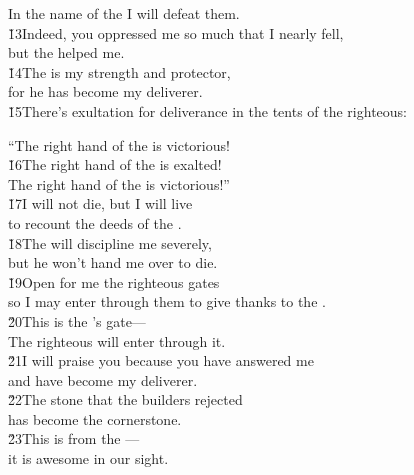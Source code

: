 \begin{poetry}
\poemlll       In the name of the  I will defeat them. \\
\poeml \v{13}Indeed, you oppressed me so much that I nearly fell, \\
\poemll    but the  helped me. \\
\poeml \v{14}The  is my strength and protector, \\
\poemll    for he has become my deliverer. \\
\poeml \v{15}There's exultation for deliverance in the tents of the righteous:
\end{poetry}

\begin{poetry}
\poeml ``The right hand of the  is victorious! \\
\poeml \v{16}The right hand of the  is exalted! \\
\poemlll       The right hand of the  is victorious!'' \\
\poeml \v{17}I will not die, but I will live \\
\poemll    to recount the deeds of the . \\
\poeml \v{18}The  will discipline me severely, \\
\poemll    but he won't hand me over to die. \\
\poeml \v{19}Open for me the righteous gates \\
\poemll    so I may enter through them to give thanks to the . \\
\poeml \v{20}This is the 's gate--- \\
\poemll    The righteous will enter through it. \\
\poeml \v{21}I will praise you because you have answered me \\
\poemll    and have become my deliverer. \\
\poeml \v{22}The stone that the builders rejected \\
\poemll    has become the cornerstone. \\
\poeml \v{23}This is from the --- \\
\poemll    it is awesome in our sight. \\

\end{poetry}
